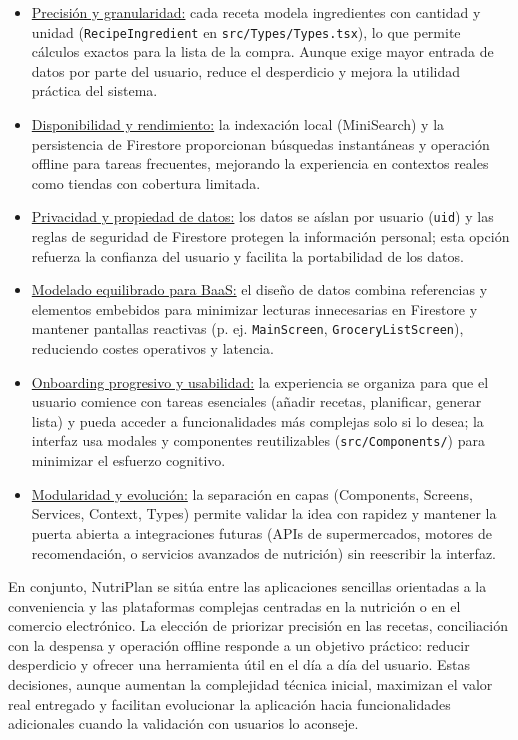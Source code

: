 \documentclass[twoside, openright, 11pt]{report}
\begin{document}
		\begin{itemize}
			\item \underline{Precisión y granularidad:} cada receta modela ingredientes con cantidad y unidad (\texttt{RecipeIngredient} en \texttt{src/Types/Types.tsx}), lo que permite cálculos exactos para la lista de la compra. Aunque exige mayor entrada de datos por parte del usuario, reduce el desperdicio y mejora la utilidad práctica del sistema.
			
			\item \underline{Disponibilidad y rendimiento:} la indexación local (MiniSearch) y la persistencia de Firestore proporcionan búsquedas instantáneas y operación offline para tareas frecuentes, mejorando la experiencia en contextos reales como tiendas con cobertura limitada.
			
			\item \underline{Privacidad y propiedad de datos:} los datos se aíslan por usuario (\texttt{uid}) y las reglas de seguridad de Firestore protegen la información personal; esta opción refuerza la confianza del usuario y facilita la portabilidad de los datos.
			
			\item \underline{Modelado equilibrado para BaaS:} el diseño de datos combina referencias y elementos embebidos para minimizar lecturas innecesarias en Firestore y mantener pantallas reactivas (p. ej. \texttt{MainScreen}, \texttt{GroceryListScreen}), reduciendo costes operativos y latencia.
			
			\item \underline{Onboarding progresivo y usabilidad:} la experiencia se organiza para que el usuario comience con tareas esenciales (añadir recetas, planificar, generar lista) y pueda acceder a funcionalidades más complejas solo si lo desea; la interfaz usa modales y componentes reutilizables (\texttt{src/Components/}) para minimizar el esfuerzo cognitivo.
			
			\item \underline{Modularidad y evolución:} la separación en capas (Components, Screens, Services, Context, Types) permite validar la idea con rapidez y mantener la puerta abierta a integraciones futuras (APIs de supermercados, motores de recomendación, o servicios avanzados de nutrición) sin reescribir la interfaz.
		\end{itemize}
		
			
			En conjunto, NutriPlan se sitúa entre las aplicaciones sencillas orientadas a la conveniencia y las plataformas complejas centradas en la nutrición o en el comercio electrónico. La elección de priorizar precisión en las recetas, conciliación con la despensa y operación offline responde a un objetivo práctico: reducir desperdicio y ofrecer una herramienta útil en el día a día del usuario. Estas decisiones, aunque aumentan la complejidad técnica inicial, maximizan el valor real entregado y facilitan evolucionar la aplicación hacia funcionalidades adicionales cuando la validación con usuarios lo aconseje.
\end{document}
